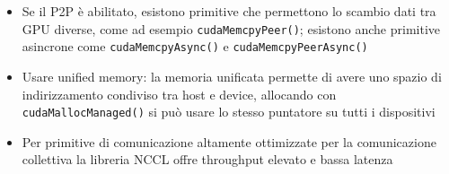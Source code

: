 \begin{questions}
\begin{solution}
\begin{itemize}
            \item Se il P2P è abilitato, esistono primitive che permettono lo scambio dati tra GPU diverse, come ad esempio \texttt{cudaMemcpyPeer()}; esistono anche primitive asincrone come \texttt{cudaMemcpyAsync()} e \texttt{cudaMemcpyPeerAsync()}
            
            \item Usare unified memory: la memoria unificata permette di avere uno spazio di indirizzamento condiviso tra host e device, allocando con \texttt{cudaMallocManaged()} si può usare lo stesso puntatore su tutti i dispositivi
            
            \item Per primitive di comunicazione altamente ottimizzate per la comunicazione collettiva la libreria NCCL offre throughput elevato e bassa latenza
        \end{itemize}
    \end{solution}
\end{questions}
